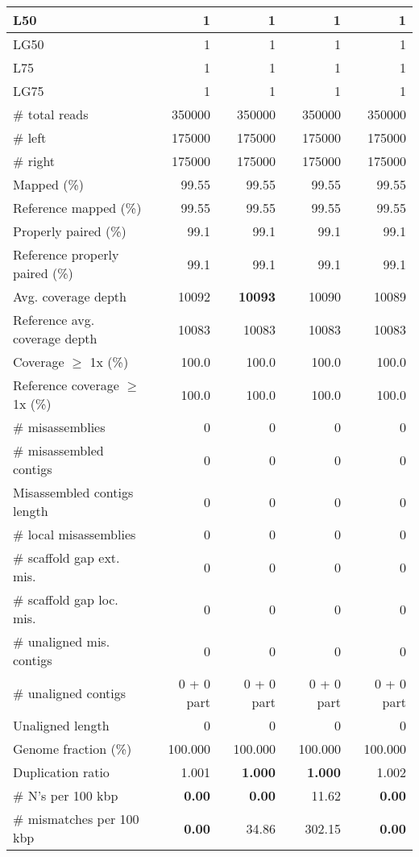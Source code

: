 \documentclass[12pt,a4paper]{article}
\begin{document}
\begin{table}[ht]
\begin{center}
\begin{tabular}{|l*{4}{|r}|}
L50 & 1 & 1 & 1 & 1 \\ \hline
LG50 & 1 & 1 & 1 & 1 \\ \hline
L75 & 1 & 1 & 1 & 1 \\ \hline
LG75 & 1 & 1 & 1 & 1 \\ \hline
\# total reads & 350000 & 350000 & 350000 & 350000 \\ \hline
\# left & 175000 & 175000 & 175000 & 175000 \\ \hline
\# right & 175000 & 175000 & 175000 & 175000 \\ \hline
Mapped (\%) & 99.55 & 99.55 & 99.55 & 99.55 \\ \hline
Reference mapped (\%) & 99.55 & 99.55 & 99.55 & 99.55 \\ \hline
Properly paired (\%) & 99.1 & 99.1 & 99.1 & 99.1 \\ \hline
Reference properly paired (\%) & 99.1 & 99.1 & 99.1 & 99.1 \\ \hline
Avg. coverage depth & 10092 & {\bf 10093} & 10090 & 10089 \\ \hline
Reference avg. coverage depth & 10083 & 10083 & 10083 & 10083 \\ \hline
Coverage $\geq$ 1x (\%) & 100.0 & 100.0 & 100.0 & 100.0 \\ \hline
Reference coverage $\geq$ 1x (\%) & 100.0 & 100.0 & 100.0 & 100.0 \\ \hline
\# misassemblies & 0 & 0 & 0 & 0 \\ \hline
\# misassembled contigs & 0 & 0 & 0 & 0 \\ \hline
Misassembled contigs length & 0 & 0 & 0 & 0 \\ \hline
\# local misassemblies & 0 & 0 & 0 & 0 \\ \hline
\# scaffold gap ext. mis. & 0 & 0 & 0 & 0 \\ \hline
\# scaffold gap loc. mis. & 0 & 0 & 0 & 0 \\ \hline
\# unaligned mis. contigs & 0 & 0 & 0 & 0 \\ \hline
\# unaligned contigs & 0 + 0 part & 0 + 0 part & 0 + 0 part & 0 + 0 part \\ \hline
Unaligned length & 0 & 0 & 0 & 0 \\ \hline
Genome fraction (\%) & 100.000 & 100.000 & 100.000 & 100.000 \\ \hline
Duplication ratio & 1.001 & {\bf 1.000} & {\bf 1.000} & 1.002 \\ \hline
\# N's per 100 kbp & {\bf 0.00} & {\bf 0.00} & 11.62 & {\bf 0.00} \\ \hline
\# mismatches per 100 kbp & {\bf 0.00} & 34.86 & 302.15 & {\bf 0.00} \\ \hline

\end{tabular}
\end{center}
\end{table}
\end{document}
